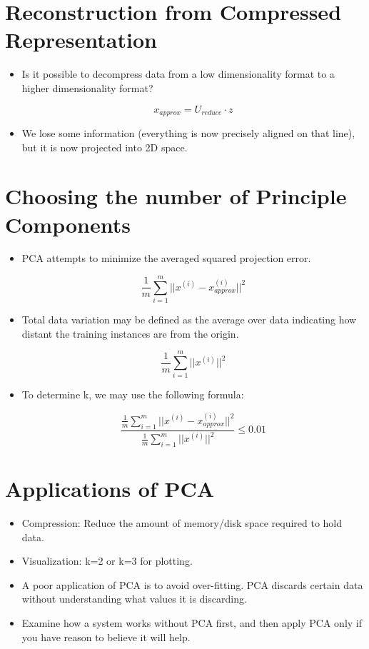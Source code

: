 \documentclass{article}
\begin{document}
\section*{Reconstruction from Compressed Representation}

\begin{itemize}
  \item Is it possible to decompress data from a low dimensionality format to a higher dimensionality format?

        $$x_{approx} = U_{reduce} \cdot z$$

  \item We lose some information (everything is now precisely aligned on that line), but it is now projected into 2D space.
\end{itemize}

\section*{Choosing the number of Principle Components}

\begin{itemize}
  \item PCA attempts to minimize the averaged squared projection error.

        $$\frac{1}{m} \sum_{i=1}^{m} ||x^{(i)} - x_{approx}^{(i)}||^2$$

  \item Total data variation may be defined as the average over data indicating how distant the training instances are from the origin.

        $$\frac{1}{m} \sum_{i=1}^{m} ||x^{(i)}||^2$$

  \item To determine k, we may use the following formula:

        $$\frac{\frac{1}{m} \sum_{i=1}^{m} ||x^{(i)} - x_{approx}^{(i)}||^2}{\frac{1}{m} \sum_{i=1}^{m} ||x^{(i)}||^2} \leq 0.01$$

\end{itemize}

\section*{Applications of PCA}


\begin{itemize}
  \item Compression: Reduce the amount of memory/disk space required to hold data.
  \item Visualization: k=2 or k=3 for plotting.
  \item A poor application of PCA is to avoid over-fitting. PCA discards certain data without understanding what values it is discarding.
  \item Examine how a system works without PCA first, and then apply PCA only if you have reason to believe it will help.
\end{itemize}
\end{document}
